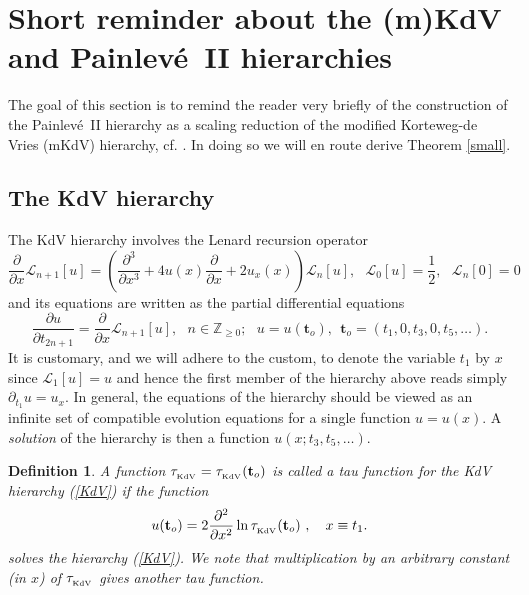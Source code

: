 \documentclass[10pt,reqno,oneside]{amsart}
\numberwithin{equation}{section}
\newtheorem{theo}{Theorem}[section]
\newtheorem{definition}[theo]{Definition}
\def\le{\left}
\def\ri{\right}
\def\bt{\begin{theo}}
\def\bd{\begin{definition}}
\def\ed{\end{definition}}
\def \pa{\partial}
\def\L{\mathcal L}
\def\eqref#1{(\ref{#1})}
\def\bt{{\mathbf t}}
\begin{document}
\section{Short reminder about the (m)KdV  and Painlev\'e\ II hierarchies}
\label{PIIhier}
The goal of this section is to remind the reader very briefly of the construction of the Painlev\'e\ II hierarchy as a scaling reduction of the modified Korteweg-de Vries (mKdV)  hierarchy, cf. \cite{CM}. In doing so we will en route derive Theorem \ref{small}. 
\subsection{The KdV hierarchy} 
The KdV hierarchy involves the Lenard recursion operator 
\begin{equation}\label{Lenard}
	\frac{\pa}{\pa x} \L_{n+1}[u] = \le(\frac{\pa^3 }{\pa x^3 }+ 4u(x)\frac{\pa}{\pa x} + 2u_x(x)\ri) \L_n[u],\ \ \ \L_0[u]=\frac{1}{2},\ \ \ \L_n[0]=0
\end{equation}
and its equations are written as the partial differential equations
\begin{equation}\label{KdV}
	\frac{\pa u}{\pa t_{2n+1}} = \frac \pa{\pa x} \L_{n+1}[u],\ \ \ n\in\mathbb{Z}_{\geq 0};\ \ \ u=u(\bt_o),\ \ \bt_o=(t_1,0,t_3,0,t_5,\ldots).
\end{equation}
It is customary, and we will adhere to the custom, to denote the variable $t_1$ by $x$ since $\L_1[u] = u$ and hence the first member of the hierarchy above reads simply $\pa_{t_1} u = u_x$. In general, the equations of the hierarchy should be viewed as an infinite set of compatible evolution equations for a single function $u = u(x)$.  A {\em solution} of the hierarchy is then a function $u(x;t_3,t_5,\dots)$.\smallskip

\bd A function $\tau_{_{\textnormal{KdV}}}=\tau_{_{\textnormal{KdV}}}(\bt_o)$ is called a tau function for the KdV hierarchy \eqref{KdV} if the function 
\begin{equation*}
	u(\bt_o) = 2 \frac {\pa^2} {\pa x^2} \ln \tau_{_{\textnormal{KdV}}}(\bt_o)\ ,\ \ \ x \equiv t_1.
\end{equation*}
solves the hierarchy \eqref{KdV}. 
We note that multiplication by an arbitrary constant (in $x$) of $\tau_{_{\textnormal{KdV}}}$ gives another tau function. 
\ed
\end{document}
